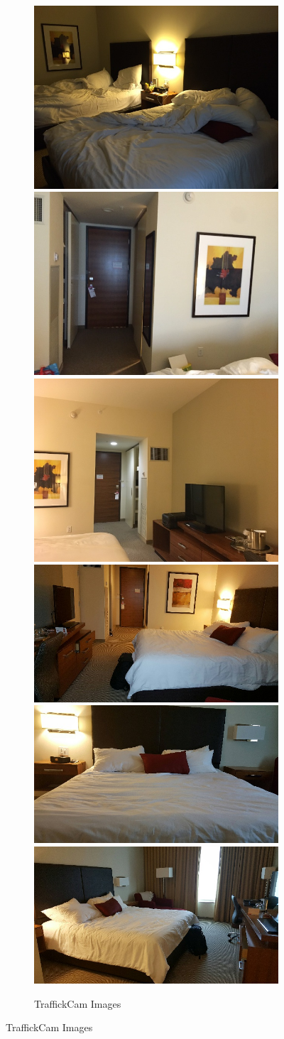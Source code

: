 \begin{figure}[ht!]
\begin{center}
  \begin{subfigure}[b]{\textwidth}
    \centering
    ~~~~~~~\includegraphics[width=.25\columnwidth]{figures/chapter3/traffickCamIms/1.jpg}
    \includegraphics[width=.25\columnwidth]{figures/chapter3/traffickCamIms/2.jpg}
    \includegraphics[width=.25\columnwidth]{figures/chapter3/traffickCamIms/3.jpg}
    \newline
    \includegraphics[width=.25\columnwidth]{figures/chapter3/traffickCamIms/4.jpg}
    \includegraphics[width=.25\columnwidth]{figures/chapter3/traffickCamIms/5.jpg}  
    \includegraphics[width=.25\columnwidth]{figures/chapter3/traffickCamIms/6.jpg}  
    \caption{TraffickCam Images}
  \end{subfigure}
  

\end{center}
\end{figure}
